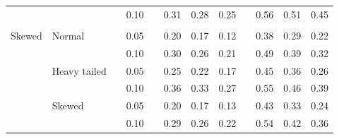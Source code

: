 \documentclass[12pt]{article} %
\begin{document}
\begin{table}[ht]
\begin{scriptsize}
\begin{center}
\begin{tabular}{ll p{.1cm} c p{.1cm} rrr p{.1cm} rrr}
             &              && 0.10 &&  0.31 & 0.28 & 0.25 && 0.56 & 0.51 & 0.45 \\ 
             &&&&&&&&&&&\\
Skewed       & Normal       && 0.05 &&  0.20 & 0.17 & 0.12 && 0.38 & 0.29 & 0.22 \\ 
             &              && 0.10 &&  0.30 & 0.26 & 0.21 && 0.49 & 0.39 & 0.32 \\ 
             & Heavy tailed && 0.05 &&  0.25 & 0.22 & 0.17 && 0.45 & 0.36 & 0.26 \\ 
             &              && 0.10 &&  0.36 & 0.33 & 0.27 && 0.55 & 0.46 & 0.39 \\ 
             & Skewed       && 0.05 &&  0.20 & 0.17 & 0.13 && 0.43 & 0.33 & 0.24 \\ 
             &              && 0.10 &&  0.29 & 0.26 & 0.22 && 0.54 & 0.42 & 0.36 \\
\hline
\end{tabular}
\end{center}
\end{scriptsize}
\end{table}
\end{document}
